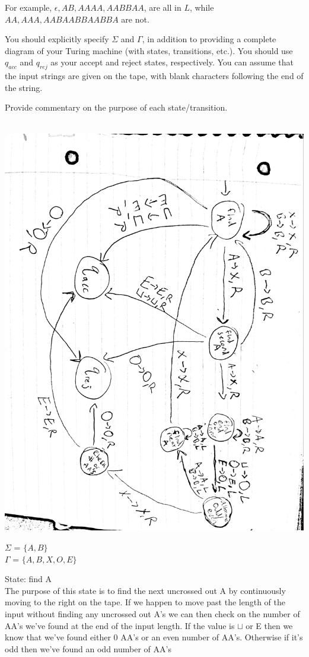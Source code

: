 \documentclass[11pt]{article}
\theoremstyle{definition}
\theoremstyle{theorem}
\newcommand{\solution}{\medskip\noindent{\color{blue}\textbf{Solution:}}}
\begin{document}
For example, $ \epsilon, AB, AAAA, AABBAA$, are all in $L$, while $AA, AAA, AABAABBAABBA$ are not.

You should explicitly specify $\Sigma$ and $\Gamma$, in addition to providing a complete diagram of your Turing machine (with states, transitions, etc.). You should use $q_{acc}$ and $q_{rej}$ as your accept and reject states, respectively. You can assume that the input strings are given on the tape, with blank characters following the end of the string.

Provide commentary on the purpose of each state/transition.

\solution \\

\includegraphics[angle=90,origin=c, scale=0.15]{./hw4p1/hw4p1.jpg}

\noindent$\Sigma$ = $\{A, B \}$ \\
$\Gamma$ = $\{A, B, X, O, E\}$

\newpage
\noindent State: find A \\ 
The purpose of this state is to find the next uncrossed out A by continuously moving to the right on the tape. If we happen to move past the length of the input without finding any uncrossed out A's we can then check on the number of AA's we've found at the end of the input length.
If the value is $\sqcup$ or E then we know that we've found either 0 AA's or an even number of AA's. Otherwise if it's odd then we've found an odd number of AA's \\~\\  
\end{document}

